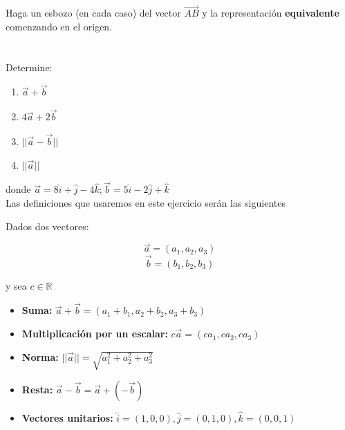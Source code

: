 \documentclass[12pt]{article}
\begin{document}
Haga un esbozo (en cada caso) del vector $\vec{AB}$ y la representación \textbf{equivalente} comenzando en el origen.

\section{}

Determine:

\begin{enumerate}
  
\item $\vec{a} + \vec{b}$
  
\item $4 \vec{a} + 2\vec{b}$

\item $||\vec{a} - \vec{b}||$

\item $||\vec{a}||$

\end{enumerate}

donde $\vec{a}=8\hat{i} + \hat{j} - 4\hat{k}; \vec{b}= 5\hat{i} - 2\hat{j} +\hat{k}$ \\

Las definiciones que usaremos en este ejercicio serán las siguientes

Dados dos vectores:

\[ \vec{a} = (a_1, a_2, a_3) \]
\[ \vec{b} = (b_1,b_2, b_3) \]

y sea $c \in \mathds{R}$

\begin{itemize}
  
\item \textbf{Suma:} $\vec{a} + \vec{b}  = (a_1 + b_1, a_2+b_2, a_3+b_3)$
  
\item \textbf{Multiplicación por un escalar:} $c\vec{a} = (ca_1, ca_2, ca_3)$
  
\item \textbf{Norma:} $||\vec{a}|| = \sqrt{a_1^2 + a_2^2 + a_3^2}$
  
\item \textbf{Resta:}  $\vec{a} - \vec{b} = \vec{a} + (-\vec{b})$
  
\item \textbf{Vectores unitarios:} $\hat{i} = (1, 0, 0),  \hat{j} = (0, 1, 0),  \hat{k} = (0, 0, 1)$

\end{itemize}
\end{document}
